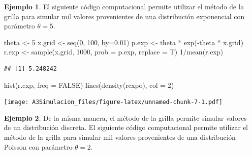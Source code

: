 \documentclass[
  10pt,
  spanish,
]{book}
\newenvironment{Shaded}{\begin{snugshade}}{\end{snugshade}}
\newcommand{\AttributeTok}[1]{\textcolor[rgb]{0.77,0.63,0.00}{#1}}
\newcommand{\ConstantTok}[1]{\textcolor[rgb]{0.00,0.00,0.00}{#1}}
\newcommand{\DecValTok}[1]{\textcolor[rgb]{0.00,0.00,0.81}{#1}}
\newcommand{\FloatTok}[1]{\textcolor[rgb]{0.00,0.00,0.81}{#1}}
\newcommand{\FunctionTok}[1]{\textcolor[rgb]{0.00,0.00,0.00}{#1}}
\newcommand{\NormalTok}[1]{#1}
\newcommand{\OtherTok}[1]{\textcolor[rgb]{0.56,0.35,0.01}{#1}}
\newcommand{\SpecialCharTok}[1]{\textcolor[rgb]{0.00,0.00,0.00}{#1}}
\theoremstyle{definition}
\theoremstyle{definition}
\newtheorem{example}{Ejemplo}[chapter]
\theoremstyle{definition}
\theoremstyle{definition}
\theoremstyle{remark}
\begin{document}
\begin{example}
\protect\hypertarget{exm:unnamed-chunk-6}{}{\label{exm:unnamed-chunk-6} }El siguiente código computacional permite utilizar el método de la grilla para simular mil valores provenientes de una distribución exponencial con parámetro \(\theta = 5\).
\end{example}

\begin{Shaded}
\begin{Highlighting}[]
\NormalTok{theta }\OtherTok{\textless{}{-}} \DecValTok{5}
\NormalTok{x.grid }\OtherTok{\textless{}{-}} \FunctionTok{seq}\NormalTok{(}\DecValTok{0}\NormalTok{, }\DecValTok{100}\NormalTok{, }\AttributeTok{by=}\FloatTok{0.01}\NormalTok{)}
\NormalTok{p.exp }\OtherTok{\textless{}{-}}\NormalTok{ theta }\SpecialCharTok{*} \FunctionTok{exp}\NormalTok{(}\SpecialCharTok{{-}}\NormalTok{theta }\SpecialCharTok{*}\NormalTok{ x.grid)}
\NormalTok{r.exp }\OtherTok{\textless{}{-}} \FunctionTok{sample}\NormalTok{(x.grid, }\DecValTok{1000}\NormalTok{, }\AttributeTok{prob =}\NormalTok{ p.exp, }\AttributeTok{replace =}\NormalTok{ T)}
\DecValTok{1}\SpecialCharTok{/}\FunctionTok{mean}\NormalTok{(r.exp)}
\end{Highlighting}
\end{Shaded}

\begin{verbatim}
## [1] 5.248242
\end{verbatim}

\begin{Shaded}
\begin{Highlighting}[]
\FunctionTok{hist}\NormalTok{(r.exp, }\AttributeTok{freq =} \ConstantTok{FALSE}\NormalTok{)}
\FunctionTok{lines}\NormalTok{(}\FunctionTok{density}\NormalTok{(rexpo), }\AttributeTok{col =} \DecValTok{2}\NormalTok{)}
\end{Highlighting}
\end{Shaded}

\texttt{[image: A3Simulacion\_files/figure-latex/unnamed-chunk-7-1.pdf]}
\begin{example}
\protect\hypertarget{exm:unnamed-chunk-8}{}{\label{exm:unnamed-chunk-8} }De la misma manera, el método de la grilla permite simular valores de un distribución discreta. El siguiente código computacional permite utilizar el método de la grilla para simular mil valores provenientes de una distribución Poisson con parámetro \(\theta = 2\).
\end{example}
\end{document}
